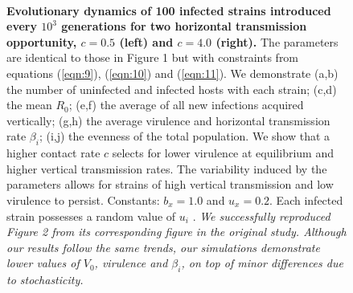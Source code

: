 \begin{figure}[tbph]
        \hfil
        \\[-2ex]
        \hfil
\captionsetup{width=1.2\linewidth}
\caption{\textbf{Evolutionary dynamics of 100 infected strains introduced every
$10^3$ generations for two horizontal transmission opportunity, $c = 0.5$ (left)
and $c = 4.0$ (right).} The parameters are identical to those in Figure 1 but
with constraints from equations (\ref{eqn:9}), (\ref{eqn:10}) and (\ref{eqn:11}).
We demonstrate (a,b) the number of uninfected and infected hosts with each
strain; (c,d) the mean $R_0$; (e,f) the average of all new infections acquired
vertically; (g,h) the average virulence and horizontal transmission rate
$\beta_i$; (i,j) the evenness of the total population. We show that a higher
contact rate $c$ selects for lower virulence at equilibrium and higher vertical
transmission rates. The variability induced by the parameters allows for strains
of high vertical transmission and low virulence to persist. Constants:
$b_x = 1.0$ and $u_x = 0.2$. Each infected strain possesses a random value of
$u_i$ \in [$u_x$, 1]. \textit{We successfully reproduced Figure 2 from its
corresponding figure in the original study. Although our results follow the
same trends, our simulations demonstrate lower values of $V_0$, virulence and
$\beta_i$, on top of minor differences due to stochasticity.}
}
\label{fig:figure2}
\end{figure}

